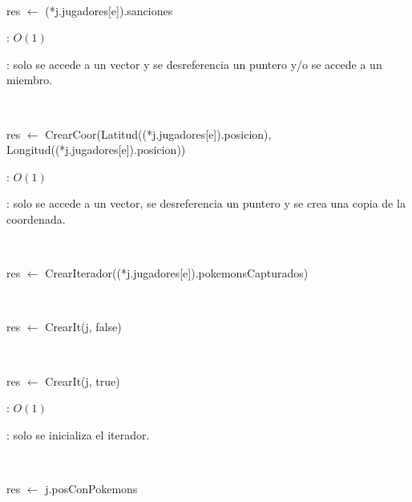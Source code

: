\begin{Algoritmos}
	~

	\begin{algorithm}[H]
		\NoCaptionOfAlgo
		\caption{}
		res $\leftarrow$ (*j.jugadores[e]).sanciones
	\end{algorithm}

	\complejidad: $O(1)$

	\justifcomp: solo se accede a un vector y se desreferencia un puntero y/o se accede a un miembro.

	~

	\begin{algorithm}[H]
		\NoCaptionOfAlgo
		\caption{}
		res $\leftarrow$ CrearCoor(Latitud((*j.jugadores[e]).posicion), Longitud((*j.jugadores[e]).posicion))
	\end{algorithm}

	\complejidad: $O(1)$

	\justifcomp: solo se accede a un vector, se desreferencia un puntero y se crea una copia de la coordenada.

	~

	\begin{algorithm}[H]
		\NoCaptionOfAlgo
		\caption{}
		res $\leftarrow$ CrearIterador((*j.jugadores[e]).pokemonsCapturados)
	\end{algorithm}

	~

	\begin{algorithm}[H]
		\NoCaptionOfAlgo
		\caption{}
		res $\leftarrow$ CrearIt(j, false)
	\end{algorithm}

	~

	\begin{algorithm}[H]
		\NoCaptionOfAlgo
		\caption{}
		res $\leftarrow$ CrearIt(j, true)
	\end{algorithm}

	\complejidad: $O(1)$

	\justifcomp: solo se inicializa el iterador. 

	~

	\begin{algorithm}[H]
		\NoCaptionOfAlgo
		\caption{}
		res $\leftarrow$ j.posConPokemons
	\end{algorithm}


\end{Algoritmos}

